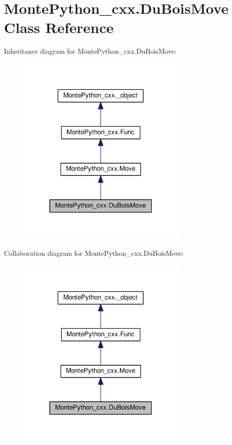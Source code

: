 \hypertarget{classMontePython__cxx_1_1DuBoisMove}{}\section{Monte\+Python\+\_\+cxx.\+Du\+Bois\+Move Class Reference}
\label{classMontePython__cxx_1_1DuBoisMove}


Inheritance diagram for Monte\+Python\+\_\+cxx.\+Du\+Bois\+Move\+:
\nopagebreak
\begin{figure}[H]
\begin{center}
\leavevmode
\includegraphics[width=235pt]{classMontePython__cxx_1_1DuBoisMove__inherit__graph}
\end{center}
\end{figure}


Collaboration diagram for Monte\+Python\+\_\+cxx.\+Du\+Bois\+Move\+:
\nopagebreak
\begin{figure}[H]
\begin{center}
\leavevmode
\includegraphics[width=235pt]{classMontePython__cxx_1_1DuBoisMove__coll__graph}
\end{center}
\end{figure}
